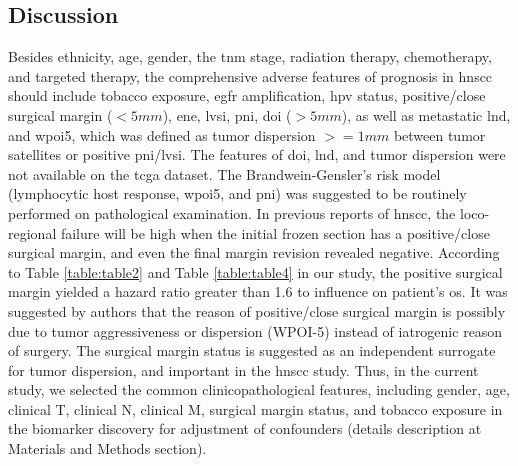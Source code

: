 \documentclass[cancers,article,submit,moreauthors,pdftex]{Definitions/mdpi}
\begin{document}
\begin{paracol}{2}
\linenumbers
\switchcolumn





\section{Discussion}


Besides ethnicity, age, gender, the \acrshort{tnm} stage, radiation therapy, chemotherapy, and targeted therapy, the comprehensive adverse features of prognosis in \acrshort{hnscc} should include tobacco exposure, \acrshort{egfr} amplification, \acrfull{hpv} status, positive/close surgical margin ($<5 mm$), \acrfull{ene}, \acrfull{lvsi}, \acrfull{pni}, \acrfull{doi} ($>5 mm$), as well as metastatic \acrfull{lnd}\cite{Cheraghlou2018}, and \acrfull{wpoi5}, which was defined as tumor dispersion $>= 1 mm$ between tumor satellites or positive \acrshort{pni}/\acrshort{lvsi}\cite{Amin2017}.
The features of \acrshort{doi}, \acrshort{lnd}, and tumor dispersion were not available on the \acrshort{tcga} dataset. The Brandwein-Gensler's risk model (lymphocytic host response, \acrshort{wpoi5}, and \acrshort{pni})\cite{Brandwein-Gensler2010}\cite{Sinha2018} was suggested to be routinely performed on pathological examination. In previous reports of \acrshort{hnscc}, the loco-regional failure will be high when the initial frozen section has a positive/close surgical margin, and even the final margin revision revealed negative\cite{Bulbul2019b}.
According to Table \ref{table:table2} and Table \ref{table:table4} in our study, the positive surgical margin yielded a hazard ratio greater than 1.6 to influence on patient's \acrshort{os}.
It was suggested by authors \cite{Scholl1986}\cite{Sutton2003}\cite{Shaw2004}\cite{Guillemaud2010a}\cite{Patel2010}\cite{Kuriakose2017}\cite{Shapiro2017}\cite{Saidak2018}\cite{Miguelanez-Medran2019}\cite{Saidak2019} that the reason of positive/close surgical margin is possibly due to tumor aggressiveness or dispersion (WPOI-5) instead of iatrogenic reason of surgery. The surgical margin status is suggested as an independent surrogate for tumor dispersion, and important in the \acrshort{hnscc} study. Thus, in the current study, we selected the common clinicopathological features, including gender, age, clinical T, clinical N, clinical M, surgical margin status, and tobacco exposure in the biomarker discovery for adjustment of confounders (details description at Materials and Methods section).


\end{paracol}
\end{document}

